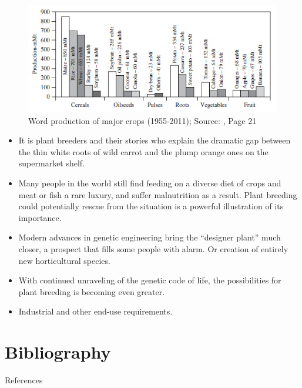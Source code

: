 \documentclass[11pt,ignorenonframetext,aspectratio=169]{beamer}
\newif\ifbibliography
\providecommand{\tightlist}{%
  \setlength{\itemsep}{0pt}\setlength{\parskip}{0pt}}
\begin{document}
\begin{frame}{}
\protect\hypertarget{section-21}{}
\begin{figure}
\includegraphics[width=0.5\linewidth]{./images/world_production_of_major_crops} \caption{Word production of major crops (1955-2011); Source: \cite{brown2014plant}, Page 21}\label{fig:world-production-major}
\end{figure}

\small

\begin{itemize}
\tightlist
\item
  It is plant breeders and their stories who explain the dramatic gap
  between the thin white roots of wild carrot and the plump orange ones
  on the supermarket shelf.
\item
  Many people in the world still find feeding on a diverse diet of crops
  and meat or fish a rare luxury, and suffer malnutrition as a result.
  Plant breeding could potentially rescue from the situation is a
  powerful illustration of its importance.
\item
  Modern advances in genetic engineering bring the ``designer plant''
  much closer, a prospect that fills some people with alarm. Or creation
  of entirely new horticultural species.
\item
  With continued unraveling of the genetic code of life, the
  possibilities for plant breeding is becoming even greater.
\item
  Industrial and other end-use requirements.
\end{itemize}
\end{frame}

\hypertarget{bibliography}{%
\section{Bibliography}\label{bibliography}}

\begin{frame}{References}
\protect\hypertarget{references}{}
\end{frame}


  \begin{frame}[allowframebreaks]{}
  \bibliographytrue
  \printbibliography[heading=none]
  \end{frame}
\end{document}
